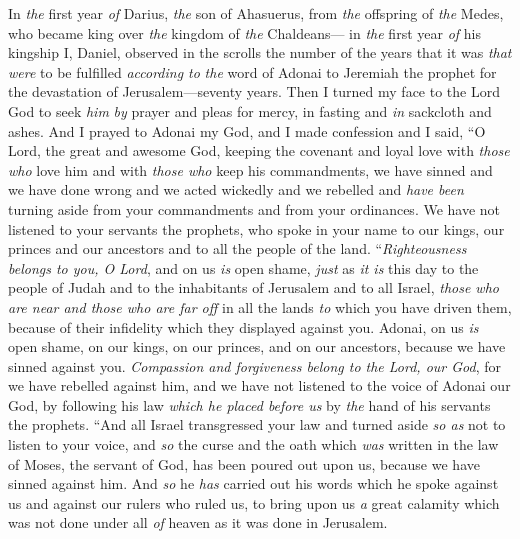 \begin{biblechapter} %
 In \textit{the} first year \textit{of} Darius, \textit{the} son of Ahasuerus, from \textit{the} offspring of \textit{the} Medes, who became king over \textit{the} kingdom of \textit{the} Chaldeans—
\verse in \textit{the} first year \textit{of} his kingship I, Daniel, observed in the scrolls the number of the years that it was \textit{that were} to be fulfilled \textit{according to} \textit{the} word of Adonai to Jeremiah the prophet for the devastation of Jerusalem—seventy years.
\verse Then I turned my face to the Lord God to seek \textit{him} \textit{by} prayer and pleas for mercy, in fasting and \textit{in} sackcloth and ashes.
\verse And I prayed to Adonai my God, and I made confession and I said, “O Lord, the great and awesome God, keeping the covenant and loyal love with \textit{those who} love him and with \textit{those who} keep his commandments,
\verse we have sinned and we have done wrong and we acted wickedly and we rebelled and \textit{have been} turning aside from your commandments and from your ordinances.
\verse We have not listened to your servants the prophets, who spoke in your name to our kings, our princes and our ancestors and to all the people of the land.
\verse “\textit{Righteousness belongs to you, O Lord}, and on us \textit{is} open shame, \textit{just} as \textit{it is} this day to the people of Judah and to the inhabitants of Jerusalem and to all Israel, \textit{those who are near and those who are far off} in all the lands \textit{to} which you have driven them, because of their infidelity which they displayed against you.
\verse Adonai, on us \textit{is} open shame, on our kings, on our princes, and on our ancestors, because we have sinned against you.
\verse \textit{Compassion and forgiveness belong to the Lord, our God}, for we have rebelled against him,
\verse and we have not listened to the voice of Adonai our God, by following his law \textit{which he placed before us} by \textit{the} hand of his servants the prophets.
\verse “And all Israel transgressed your law and turned aside \textit{so as} not to listen to your voice, and \textit{so} the curse and the oath which \textit{was} written in the law of Moses, the servant of God, has been poured out upon us, because we have sinned against him.
\verse And \textit{so} he \textit{has} carried out his words which he spoke against us and against our rulers who ruled us, to bring upon us \textit{a} great calamity which was not done under all \textit{of} heaven as it was done in Jerusalem.

\end{biblechapter}
